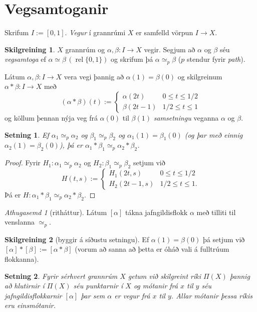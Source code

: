\documentclass[a4paper,icelandic]{book}
\theoremstyle{definition}
\newtheorem{skilgr}{Skilgreining}[section]
\theoremstyle{plain}
\newtheorem{setn}{Setning}[section]
\theoremstyle{remark}
\newtheorem*{ath}{Athugasemd}
\DeclareMathOperator{\rel}{rel}
\newcommand{\prel}[1]{\,\left(\rel #1\right)}
\begin{document}
\section{Vegsamtoganir}
Skrifum $I:=[0,1]$. \emph{Vegur} í grannrúmi $X$ er
samfelld vörpun $I\to X$.
\begin{skilgr}
  $X$ grannrúm og $\alpha,\beta:I\to X$ vegir. Segjum að $\alpha$ og
  $\beta$ séu \emph{vegsamtoga} ef
  $\alpha\simeq\beta\prel{\{0,1\}}$ og skrifum þá $\alpha\simeq_p\beta$
  ($p$ stendur fyrir \emph{path}).
  
  Látum $\alpha,\beta:I\to X$ vera vegi þannig að $\alpha(1)=\beta(0)$
  og skilgreinum $\alpha*\beta:I\to X$ með 
  \[
  (\alpha*\beta)(t) :=
  \begin{cases}
    \alpha(2t)  & 0\leq t \leq 1/2\\
    \beta(2t-1) & 1/2\leq t\leq 1
  \end{cases}
  \]
  og köllum þennan nýja veg frá $\alpha(0)$ til $\beta(1)$
  \emph{samsetningu} veganna $\alpha$ og $\beta$.
\end{skilgr}
\begin{setn}
  Ef $\alpha_1\simeq_p\alpha_2$ og $\beta_1\simeq_p\beta_2$ og
  $\alpha_1(1)=\beta_1(0)$ (og þar með einnig $\alpha_2(1)=\beta_2(0)$),
  þá er $\alpha_1*\beta_1\simeq_p\alpha_2*\beta_2$.
\end{setn}
\begin{proof}
  Fyrir $H_1:\alpha_1\simeq_p\alpha_2$ og $H_2:\beta_1\simeq_p\beta_2$
  setjum við\[
  H(t,s) := 
  \begin{cases}
    H_1(2t,s)   & 0\leq t\leq 1/2\\
    H_2(2t-1,s) & 1/2\leq t\leq 1.
  \end{cases}
  \]
  Þá er $H:\alpha_1*\beta_1\simeq_p\alpha_2*\beta_2$.
\end{proof}
\begin{ath}
  [ritháttur]
  Látum $[\alpha]$ tákna jafngildisflokk $\alpha$ með tilliti til
  venslanna $\simeq_p$.
\end{ath}
\begin{skilgr}
  [byggir á síðustu setningu]
  Ef $\alpha(1)=\beta(0)$ þá setjum við
  $[\alpha]*[\beta]:=[\alpha*\beta]$ (vorum að sanna að þetta er óháð
  vali á fulltrúum flokkanna).
\end{skilgr}
\begin{setn}
  Fyrir sérhvert grannrúm $X$ getum við skilgreint ríki $\Pi(X)$ þannig
  að hlutirnir í $\Pi(X)$ séu punktarnir í $X$ og mótanir frá $x$ til
  $y$ séu jafngildisflokkarnir $[\alpha]$ þar sem $\alpha$ er vegur frá
  $x$ til $y$. Allar mótanir þessa ríkis eru einsmótanir.
\end{setn}
\end{document}
